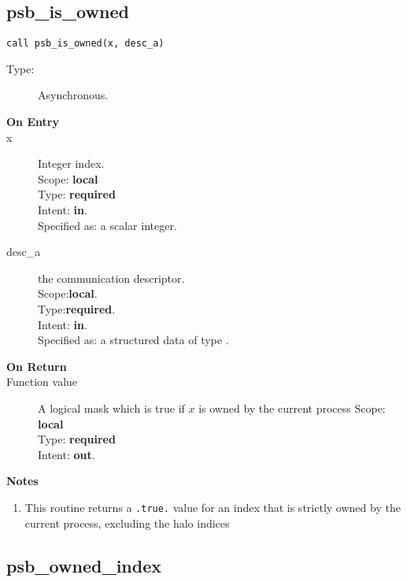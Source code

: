 %
%
\clearpage\subsection*{psb\_is\_owned }

\begin{verbatim}
call psb_is_owned(x, desc_a)
\end{verbatim}

\begin{description}
\item[Type:] Asynchronous.
\item[\bf On Entry]
\item[x] Integer index.\\
Scope: {\bf local} \\
Type: {\bf required}\\
Intent: {\bf in}.\\
Specified as: a scalar integer.\\
\item[desc\_a] the communication descriptor.\\
Scope:{\bf local}.\\
Type:{\bf required}.\\
Intent: {\bf in}.\\
Specified as: a structured data of type \descdata.
\end{description}

\begin{description}
\item[\bf On Return]
\item[Function value] A logical mask which is true if 
  $x$ is  owned by the current process
Scope: {\bf local} \\
Type: {\bf required}\\
Intent: {\bf out}.\\
\end{description}


{\par\noindent\large\bfseries Notes}
\begin{enumerate}
\item This routine returns a \verb|.true.| value for an index
  that is strictly owned by the current process, excluding the halo
  indices
\end{enumerate}


\clearpage\subsection*{psb\_owned\_index }

